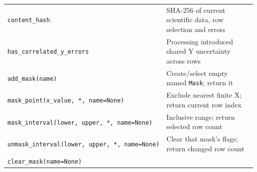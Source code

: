 \documentclass[
  10pt,
  a4paper,
  oneside]{scrreprt}
\begin{document}
\begin{longtable}[]{@{}ll@{}}
\begin{minipage}[t]{0.47\columnwidth}
\texttt{content\_hash}\strut
\end{minipage} & \begin{minipage}[t]{0.47\columnwidth}\raggedright
SHA-256 of current scientific data, row selection and errors\strut
\end{minipage}\tabularnewline
\begin{minipage}[t]{0.47\columnwidth}\raggedright
\texttt{has\_correlated\_y\_errors}\strut
\end{minipage} & \begin{minipage}[t]{0.47\columnwidth}\raggedright
Processing introduced shared Y uncertainty across rows\strut
\end{minipage}\tabularnewline
\begin{minipage}[t]{0.47\columnwidth}\raggedright
\texttt{add\_mask(name)}\strut
\end{minipage} & \begin{minipage}[t]{0.47\columnwidth}\raggedright
Create/select empty named \texttt{Mask}; return it\strut
\end{minipage}\tabularnewline
\begin{minipage}[t]{0.47\columnwidth}\raggedright
\texttt{mask\_point(x\_value,\ *,\ name=None)}\strut
\end{minipage} & \begin{minipage}[t]{0.47\columnwidth}\raggedright
Exclude nearest finite X; return current row index\strut
\end{minipage}\tabularnewline
\begin{minipage}[t]{0.47\columnwidth}\raggedright
\texttt{mask\_interval(lower,\ upper,\ *,\ name=None)}\strut
\end{minipage} & \begin{minipage}[t]{0.47\columnwidth}\raggedright
Inclusive range; return selected row count\strut
\end{minipage}\tabularnewline
\begin{minipage}[t]{0.47\columnwidth}\raggedright
\texttt{unmask\_interval(lower,\ upper,\ *,\ name=None)}\strut
\end{minipage} & \begin{minipage}[t]{0.47\columnwidth}\raggedright
Clear that mask's flags; return changed row count\strut
\end{minipage}\tabularnewline
\begin{minipage}[t]{0.47\columnwidth}\raggedright
\texttt{clear\_mask(name=None)}\strut
\end{minipage} & \begin{minipage}[t]{0.47\columnwidth}\raggedright

\end{minipage}
\end{longtable}
\end{document}
